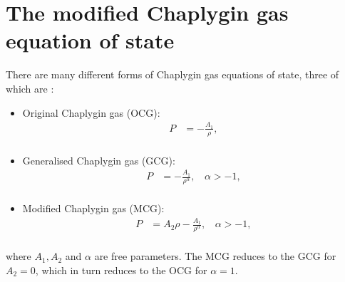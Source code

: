 \documentclass[a4paper, 11pt]{FSKH_623_Report}
\numberwithin{equation}{section}
\begin{document}
\section{The modified Chaplygin gas equation of state}
\renewcommand{\baselinestretch}{0.5}
There are many different forms of Chaplygin gas equations of state, three of which are \citep{kahya2015universe}:
\begin{itemize}
\item Original Chaplygin gas (OCG):
\begin{equation}\label{eq:OCG}
\begin{split}
P &= -\frac{A_{1}}{\rho},         \\
\end{split}
\end{equation}
\item Generalised Chaplygin gas (GCG):
\begin{equation}\label{eq:GCG}
\begin{split}
P &= -\frac{A_{1}}{\rho^{\alpha}},\ \ \ \ \alpha>-1,         \\
\end{split}
\end{equation}
\item Modified Chaplygin gas (MCG):
\begin{equation}\label{eq:MCG}
\begin{split}
P &=A_{2}\rho -\frac{A_{1}}{\rho^{\alpha}},\ \ \ \ \alpha>-1,         \\
\end{split}
\end{equation}
\end{itemize}
\renewcommand{\baselinestretch}{1.3}
where $A_{1},A_{2}$ and $\alpha$ are free parameters. The MCG reduces to the GCG for $A_{2}=0$, which in turn reduces to the OCG for $\alpha=1$.
\end{document}
